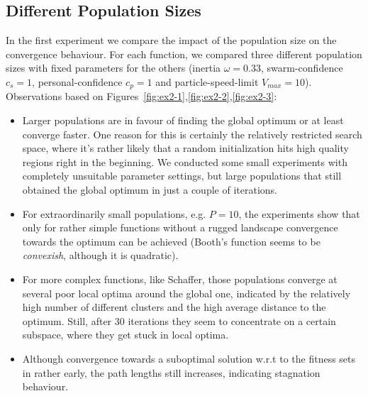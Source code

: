 \documentclass[12pt]{article}
\begin{document}
\subsection{Different Population Sizes}
In the first experiment we compare the impact of the population size on the convergence behaviour. 
For each function, we compared three different population sizes with fixed parameters for the others (inertia $\omega=0.33$, swarm-confidence $c_s=1$, personal-confidence $c_p=1$ and particle-speed-limit $V_{max}=10$).
Observations based on Figures~\ref{fig:ex2-1},\ref{fig:ex2-2},\ref{fig:ex2-3}:
\begin{itemize}
	\item Larger populations are in favour of finding the global optimum or at least converge faster. 
	One reason for this is certainly the relatively restricted search space, where it's rather likely that a random initialization hits high quality regions right in the beginning. 
	We conducted some small experiments with completely unsuitable parameter settings, but large populations that still obtained the global optimum in just a couple of iterations. 
	\item For extraordinarily small populations, e.g. $P=10$, the experiments show that only for rather simple functions without a rugged landscape convergence towards the optimum can be achieved (Booth's function seems to be \emph{convexish}, although it is quadratic). 
	\item For more complex functions, like Schaffer, those populations converge at several poor local optima around the global one, indicated by the relatively high number of different clusters and the high average distance to the optimum. 
	Still, after $30$ iterations they seem to concentrate on a certain subspace, where they get stuck in local optima. 
	\item Although convergence towards a suboptimal solution w.r.t to the fitness sets in rather early, the path lengths still increases, indicating stagnation behaviour. 
\end{itemize}
\end{document}
